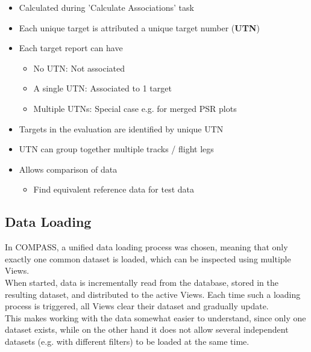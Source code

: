 \begin{itemize}
\item Calculated during 'Calculate Associations' task
\item Each unique target is attributed a unique target number (\textbf{UTN})
\item Each target report can have
\begin{itemize}
\item No UTN: Not associated
\item A single UTN: Associated to 1 target
\item Multiple UTNs: Special case e.g. for merged PSR plots
\end{itemize}
\item Targets in the evaluation are identified by unique UTN
\item UTN can group together multiple tracks / flight legs
\item Allows comparison of data
\begin{itemize}
\item Find equivalent reference data for test data
\end{itemize}
\end{itemize}

\subsection*{Data Loading}
In COMPASS, a unified data loading process was chosen, meaning that only exactly one common dataset is loaded, which can be inspected using multiple Views. \\

When started, data is incrementally read from the database, stored in the resulting dataset, and distributed to the active Views. Each time such a loading process is triggered, all Views clear their dataset and gradually update. \\

This makes working with the data somewhat easier to understand, since only one dataset exists, while on the other hand it does not allow several independent datasets (e.g. with different filters) to be loaded at the same time. \\

